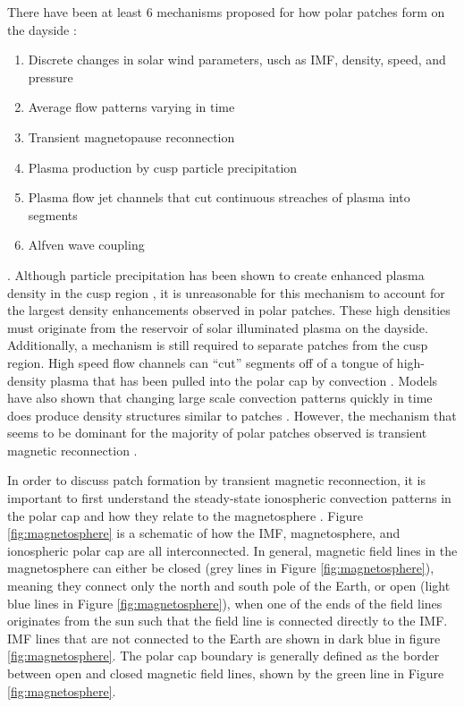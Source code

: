 There have been at least 6 mechanisms proposed for how polar patches form on the dayside \citep{Crowley1996,Carlson2012}:
\begin{enumerate}
	\item Discrete changes in solar wind parameters, usch as IMF, density, speed, and pressure \citep{Sojka1994}
	\item Average flow patterns varying in time \citep{Anderson1988}
	\item Transient magnetopause reconnection \citep{Lockwood1992b}
	\item Plasma production by cusp particle precipitation \citep{Rodger1994,Millward1999}
	\item Plasma flow jet channels that cut continuous streaches of plasma into segments 	\citep{Valladares1998}
	\item Alfven wave coupling \citep{Prikryl1999}
\end{enumerate}.
Although particle precipitation has been shown to create enhanced plasma density in the cusp region \citep{Rodger1994}, it is unreasonable for this mechanism to account for the largest density enhancements observed in polar patches.  These high densities must originate from the reservoir of solar illuminated plasma on the dayside.  Additionally, a mechanism is still required to separate patches from the cusp region.  High speed flow channels can ``cut'' segments off of a tongue of high-density plasma that has been pulled into the polar cap by convection \citep{Valladares1994,Valladares1998}.  Models have also shown that changing large scale convection patterns quickly in time does produce density structures similar to patches \citep{Anderson1988}.  However, the mechanism that seems to be dominant for the majority of polar patches observed is transient magnetic reconnection \citep{Carlson2012}.

In order to discuss patch formation by transient magnetic reconnection, it is important to first understand the steady-state ionospheric convection patterns in the polar cap and how they relate to the magnetosphere \citep{Cowley1980}.  Figure \ref{fig:magnetosphere} is a schematic of how the IMF, magnetosphere, and ionospheric polar cap are all interconnected.  In general, magnetic field lines in the magnetosphere can either be closed (grey lines in Figure \ref{fig:magnetosphere}), meaning they connect only the north and south pole of the Earth, or open (light blue lines in Figure \ref{fig:magnetosphere}), when one of the ends of the field lines originates from the sun such that the field line is connected directly to the IMF.  IMF lines that are not connected to the Earth are shown in dark blue in figure \ref{fig:magnetosphere}.  The polar cap boundary is generally defined as the border between open and closed magnetic field lines, shown by the green line in Figure \ref{fig:magnetosphere}.

